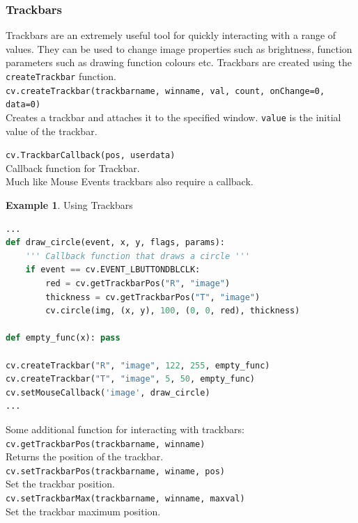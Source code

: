 \documentclass{article}
\theoremstyle{definition}
\newtheorem{ex}{Example}[subsection]
\theoremstyle{remark}
\newcommand{\func}[2]{\noindent\lstinline{#1}\\#2}
\begin{document}
\subsubsection{Trackbars}

Trackbars are an extremely useful tool for quickly interacting with a range of values. They can be used to change image properties such as brightness, function parameters such as drawing function colours etc. Trackbars are created using the \lstinline{createTrackbar} function.\\

\func{cv.createTrackbar(trackbarname, winname, val, count, onChange=0, data=0)}{Creates a trackbar and attaches it to the specified window. \lstinline{value} is the initial value of the trackbar.}

\func{cv.TrackbarCallback(pos, userdata)}{Callback function for Trackbar.\\}

\noindent Much like Mouse Events trackbars also require a callback.\\

\begin{ex}Using Trackbars
\begin{lstlisting}[language=Python]
...
def draw_circle(event, x, y, flags, params):
    ''' Callback function that draws a circle '''
    if event == cv.EVENT_LBUTTONDBLCLK:
        red = cv.getTrackbarPos("R", "image")
        thickness = cv.getTrackbarPos("T", "image")
        cv.circle(img, (x, y), 100, (0, 0, red), thickness)

def empty_func(x): pass

cv.createTrackbar("R", "image", 122, 255, empty_func)
cv.createTrackbar("T", "image", 5, 50, empty_func)
cv.setMouseCallback('image', draw_circle)
...
\end{lstlisting}
\end{ex}

\noindent Some additional function for interacting with trackbars:\\


\func{cv.getTrackbarPos(trackbarname, winname)}{Returns the position of the trackbar.\\}

\func{cv.setTrackbarPos(trackbarname, winame, pos)}{Set the trackbar position.\\}

\func{cv.setTrackbarMax(trackbarname, winname, maxval)}{Set the trackbar maximum position.\\}
\end{document}
